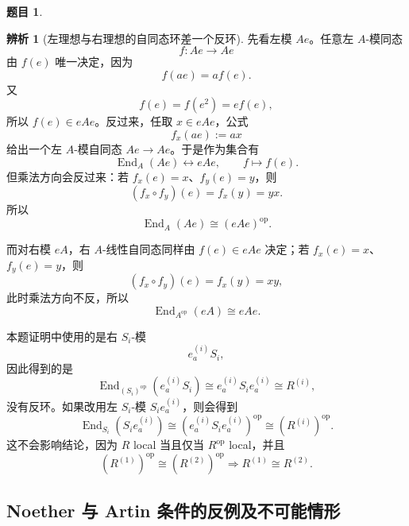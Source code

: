 \documentclass[a4paper]{ctexart}
\theoremstyle{definition}
\newtheorem{example}{题目}[section]
\theoremstyle{analysis}
\newtheorem{remark}{辨析}[section]
\theoremstyle{plain}
\begin{document}
\begin{example}
\begin{remark}[左理想与右理想的自同态环差一个反环]
先看左模 \(Ae\)。任意左 \(A\)-模同态
\[
  f:Ae\to Ae
\]
由 \(f(e)\) 唯一决定，因为
\[
  f(ae)=af(e).
\]
又
\[
  f(e)=f(e^2)=ef(e),
\]
所以 \(f(e)\in eAe\)。反过来，任取 \(x\in eAe\)，公式
\[
  f_x(ae):=ax
\]
给出一个左 \(A\)-模自同态 \(Ae\to Ae\)。于是作为集合有
\[
  \operatorname{End}_A(Ae)\leftrightarrow eAe,\qquad f\mapsto f(e).
\]
但乘法方向会反过来：若 \(f_x(e)=x\)、\(f_y(e)=y\)，则
\[
  (f_x\circ f_y)(e)=f_x(y)=yx.
\]
所以
\[
  \operatorname{End}_A(Ae)\cong (eAe)^{\operatorname{op}}.
\]

而对右模 \(eA\)，右 \(A\)-线性自同态同样由 \(f(e)\in eAe\) 决定；若 \(f_x(e)=x\)、\(f_y(e)=y\)，则
\[
  (f_x\circ f_y)(e)=f_x(y)=xy,
\]
此时乘法方向不反，所以
\[
  \operatorname{End}_{A^{\operatorname{op}}}(eA)\cong eAe.
\]

本题证明中使用的是右 \(S_i\)-模
\[
  e^{(i)}_aS_i,
\]
因此得到的是
\[
  \operatorname{End}_{(S_i)^{\operatorname{op}}}(e^{(i)}_aS_i)
  \cong e^{(i)}_aS_i e^{(i)}_a
  \cong R^{(i)},
\]
没有反环。如果改用左 \(S_i\)-模 \(S_i e^{(i)}_a\)，则会得到
\[
  \operatorname{End}_{S_i}(S_i e^{(i)}_a)\cong (e^{(i)}_aS_i e^{(i)}_a)^{\operatorname{op}}\cong (R^{(i)})^{\operatorname{op}}.
\]
这不会影响结论，因为 \(R\) local 当且仅当 \(R^{\operatorname{op}}\) local，并且
\[
  (R^{(1)})^{\operatorname{op}}\cong (R^{(2)})^{\operatorname{op}}
  \Longrightarrow
  R^{(1)}\cong R^{(2)}.
\]
\end{remark}
\end{example}

\subsection{Noether 与 Artin 条件的反例及不可能情形}
\label{subsec:problem-noether-artin-examples}
\end{document}
